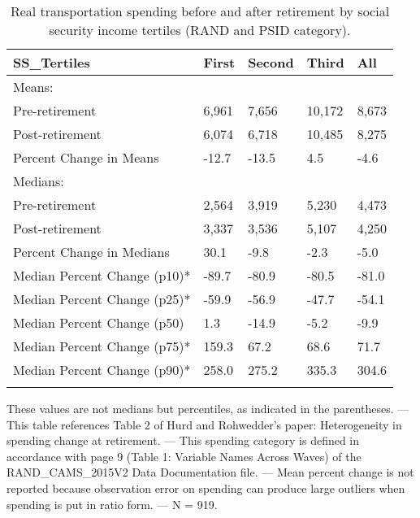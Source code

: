 \begin{table}[tbp] \centering
{}

\caption{Real transportation spending before and after retirement by social security income tertiles (RAND and PSID category).}
\begin{tabularx}{\textwidth}{lCCCC}

\toprule
{SS\_Tertiles}&{First}&{Second}&{Third}&{All} \tabularnewline
\midrule\addlinespace[1.5ex]
Means:&&&& \tabularnewline
\midrule Pre-retirement&6,961&7,656&10,172&8,673 \tabularnewline
Post-retirement&6,074&6,718&10,485&8,275 \tabularnewline
Percent Change in Means&-12.7&-13.5&4.5&-4.6 \tabularnewline
\midrule Medians:&&&& \tabularnewline
\midrule Pre-retirement&2,564&3,919&5,230&4,473 \tabularnewline
Post-retirement&3,337&3,536&5,107&4,250 \tabularnewline
Percent Change in Medians&30.1&-9.8&-2.3&-5.0 \tabularnewline
Median Percent Change (p10)*&-89.7&-80.9&-80.5&-81.0 \tabularnewline
Median Percent Change (p25)*&-59.9&-56.9&-47.7&-54.1 \tabularnewline
Median Percent Change (p50)&1.3&-14.9&-5.2&-9.9 \tabularnewline
Median Percent Change (p75)*&159.3&67.2&68.6&71.7 \tabularnewline
Median Percent Change (p90)*&258.0&275.2&335.3&304.6 \tabularnewline
\bottomrule \addlinespace[1.5ex]

\end{tabularx}
\begin{flushleft}
\footnotesize *These values are not medians but percentiles, as indicated in the parentheses. \linebreak --- \linebreak This table references Table 2 of Hurd and Rohwedder's paper: Heterogeneity in spending change at retirement. \linebreak --- \linebreak This spending category is defined in accordance with page 9 (Table 1: Variable Names Across Waves) of the RAND\_CAMS\_2015V2 Data Documentation file. \linebreak --- \linebreak Mean percent change is not reported because observation error on spending can produce large outliers when spending is put in ratio form. \linebreak --- \linebreak N = 919.
\end{flushleft}
\end{table}
